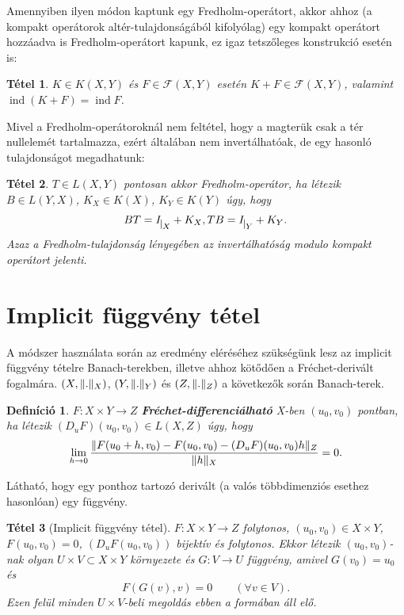 \documentclass[oneside, titlepage, 12pt, a4paper]{report}
\newtheorem{theorem}{Tétel}[section]
\newtheorem{definition}{Definíció}[section]
\DeclareMathOperator{\ind}{ind}	%
\DeclarePairedDelimiter\norm{\lVert}{\rVert}	%
\begin{document}
Amennyiben ilyen módon kaptunk egy Fredholm-operátort, akkor ahhoz (a kompakt operátorok altér-tulajdonságából kifolyólag) egy kompakt operátort hozzáadva is Fredholm-operátort kapunk, ez igaz tetszőleges konstrukció esetén is:
\begin{theorem}
$K \in K(X, Y)$ és $F \in \mathcal{F}(X, Y)$ esetén $K + F \in \mathcal{F}(X, Y)$, valamint $\ind(K + F) = \ind F$. \cite{FcNotex}
\end{theorem}

Mivel a Fredholm-operátoroknál nem feltétel, hogy a magterük csak a tér nullelemét tartalmazza, ezért általában nem invertálhatóak, de egy hasonló tulajdonságot megadhatunk:	%
\begin{theorem}
$T \in L(X, Y)$ pontosan akkor Fredholm-operátor, ha létezik $B \in L(Y, X)$, $K_X \in K(X)$, $K_Y \in K(Y)$ úgy, hogy
\begin{equation*}
BT = I_{\mkern 1mu \vrule height 2ex\mkern2mu X} + K_X, TB = I_{\mkern 1mu \vrule height 2ex\mkern2mu Y} + K_Y.
\end{equation*}
Azaz a Fredholm-tulajdonság lényegében az invertálhatóság modulo kompakt operátort jelenti. \cite{FcNotex, diffun2}
\end{theorem}

%
\section{Implicit függvény tétel}
\label{sec:implicitfvtetel}

A módszer használata során az eredmény eléréséhez szükségünk lesz az implicit függvény tételre Banach-terekben, illetve ahhoz kötődően a Fréchet-derivált fogalmára. $(X, \norm{.}_X)$, $(Y, \norm{.}_Y)$ és $(Z, \norm{.}_Z)$ a következők során Banach-terek.

\begin{definition}
$F : X \times Y \rightarrow Z$ \textbf{Fréchet-differenciálható} X-ben $(u_0, v_0)$ pontban, ha létezik $(D_uF)(u_0, v_0) \in L(X, Z)$ úgy, hogy
\begin{equation*}
\lim_{h \to 0} \frac{\norm{F(u_0 + h, v_0) - F(u_0, v_0) - (D_uF)(u_0, v_0)h}_Z}{\norm{h}_X} = 0.
\end{equation*}
\end{definition}
Látható, hogy egy ponthoz tartozó derivált (a valós többdimenziós esethez hasonlóan) egy függvény.

\begin{theorem}[Implicit függvény tétel]
$F : X \times Y \rightarrow Z$ folytonos, $(u_0, v_0) \in X \times Y$, $F(u_0, v_0) = 0$, $(D_uF(u_0, v_0))$ bijektív és folytonos. Ekkor létezik $(u_0, v_0)$-nak olyan $U \times V \subset X \times Y$ környezete és $G:V \rightarrow U$ függvény, amivel $G(v_0) = u_0$ és
\begin{equation*}
F(G(v), v) = 0 \qquad (\forall v \in V).
\end{equation*}
Ezen felül minden $U \times V$-beli megoldás ebben a formában áll elő. \cite{IFaLS}
\end{theorem}
\end{document}
